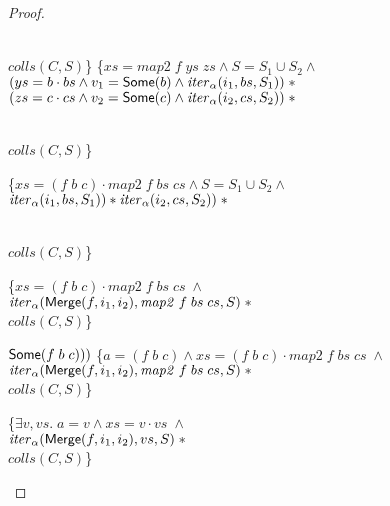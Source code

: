 \begin{proof}
\begin{itemize}
\begin{specification}
\\ \> \> \>\;     $\mathit{colls}(C,S)$\}
\nextline \> \> \{$xs = \mathit{map2}\;f\;ys\;zs \land 
                  S = S_1 \cup S_2 \land$ 
\\ \> \> \>\;    $(ys = b\cdot bs \land v_1 = \mathsf{Some}(b) \land 
                                \mathit{iter}_\alpha(i_1, bs, S_1)) \;*$
\\ \> \> \>\;    $(zs = c\cdot cs \land v_2 = \mathsf{Some}(c) \land 
                                \mathit{iter}_\alpha(i_2, cs, S_2)) \;*$

\\ \> \> \>\;     $\mathit{colls}(C,S)$\}

\nextline \> \> \{$xs = (f\;b\;c) \cdot \mathit{map2}\;f\;bs\;cs \land 
                  S = S_1 \cup S_2 \land$ 
\\ \> \> \>\;    $\mathit{iter}_\alpha(i_1, bs, S_1)) * \mathit{iter}_\alpha(i_2, cs, S_2)) \;*$

\\ \> \> \>\;     $\mathit{colls}(C,S)$\}

\nextline \> \> \{$xs = (f\;b\;c) \cdot \mathit{map2}\;f\;bs\;cs \; \land$
\\ \> \> \>\;    $\mathit{iter}_\alpha(\mathsf{Merge}(f, i_1, i_2), \mathit{map2}\;f\;bs\;cs, S) \;*$
\\ \> \> \>\;     $\mathit{colls}(C,S)$\}

\nextline \> \> $\mathsf{Some}(f\;b\;c)))$ 
\nextline \> \> \{$a = (f\;b\;c) \land xs = (f\;b\;c) \cdot \mathit{map2}\;f\;bs\;cs \; \land$
\\ \> \> \>\;    $\mathit{iter}_\alpha(\mathsf{Merge}(f, i_1, i_2), \mathit{map2}\;f\;bs\;cs, S) \;*$
\\ \> \> \>\;     $\mathit{colls}(C,S)$\}

\nextline \> \> \{$\exists v, vs.\; a = v \land xs = v \cdot vs \; \land$
\\ \> \> \>\;    $\mathit{iter}_\alpha(\mathsf{Merge}(f, i_1, i_2), vs, S) \;*$
\\ \> \> \>\;     $\mathit{colls}(C,S)$\}


\end{specification}

\end{itemize}

\end{proof}


